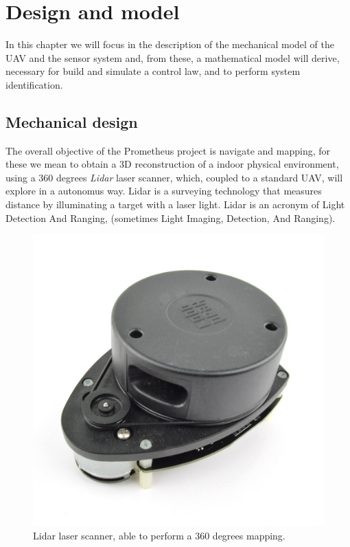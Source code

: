\documentclass[11pt, a4paper, onecolumn, fleqn, twoside, titlepage, openright]{book}
\begin{document}
	\chapter{Design and model}
	\label{designModel}

	In this chapter we will focus in the description of the mechanical model of the UAV and the sensor system and, from these, a mathematical model will derive, necessary for build and simulate a control law, and to perform system identification.

	\section{Mechanical design}
	\label{mechanicalDesign}

	The overall objective of the Prometheus project is navigate and mapping, for these we mean to obtain a 3D reconstruction of a indoor physical environment, using a 360 degrees \textit{Lidar} laser scanner, which, coupled to a standard UAV, will explore in a autonomus way. Lidar is a surveying technology that measures distance by illuminating a target with a laser light. Lidar is an acronym of Light Detection And Ranging, (sometimes Light Imaging, Detection, And Ranging). 

	\begin{figure}
		\includegraphics[scale=0.21]{images/lidar_laser.jpg}
		\caption{Lidar laser scanner, able to perform a 360 degrees mapping.}
		\label{fig:lidar}
	\end{figure}
\end{document}
